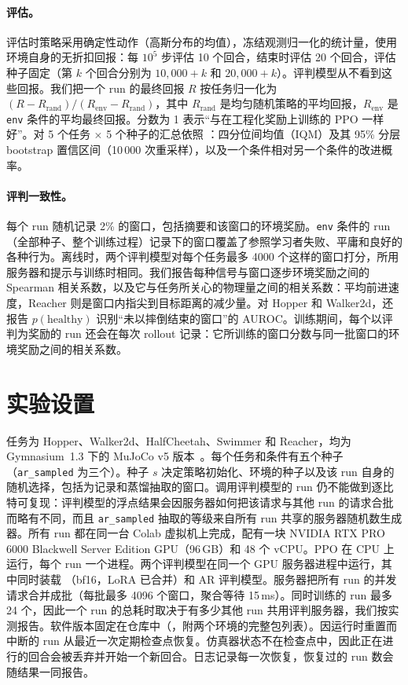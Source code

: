 \paragraph{评估。} 评估时策略采用确定性动作（高斯分布的均值），冻结观测归一化的统计量，使用环境自身的无折扣回报：每 $10^5$ 步评估 10 个回合，结束时评估 20 个回合，评估种子固定（第 $k$ 个回合分别为 $10,000+k$ 和 $20,000+k$）。评判模型从不看到这些回报。我们把一个 run 的最终回报 $R$ 按任务归一化为 $(R-R_{\text{rand}})/(R_{\text{env}}-R_{\text{rand}})$，其中 $R_{\text{rand}}$ 是均匀随机策略的平均回报，$R_{\text{env}}$ 是 \texttt{env} 条件的平均最终回报。分数为 1 表示“与在工程化奖励上训练的 PPO 一样好”。对 5 个任务 $\times$ 5 个种子的汇总依照 \citet{agarwal2021deep}：四分位间均值（IQM）及其 95\% 分层 bootstrap 置信区间（10\,000 次重采样），以及一个条件相对另一个条件的改进概率。

\paragraph{评判一致性。} 每个 run 随机记录 2\% 的窗口，包括摘要和该窗口的环境奖励。\texttt{env} 条件的 run（全部种子、整个训练过程）记录下的窗口覆盖了参照学习者失败、平庸和良好的各种行为。离线时，两个评判模型对每个任务最多 4000 个这样的窗口打分，所用服务器和提示与训练时相同。我们报告每种信号与窗口逐步环境奖励之间的 Spearman 相关系数，以及它与任务所关心的物理量之间的相关系数：平均前进速度，Reacher 则是窗口内指尖到目标距离的减少量。对 Hopper 和 Walker2d，还报告 $p(\text{healthy})$ 识别“未以摔倒结束的窗口”的 AUROC。训练期间，每个以评判为奖励的 run 还会在每次 rollout 记录：它所训练的窗口分数与同一批窗口的环境奖励之间的相关系数。

\section{实验设置}\label{sec:setup}

任务为 Hopper、Walker2d、HalfCheetah、Swimmer 和 Reacher，均为 Gymnasium~1.3 下的 MuJoCo v5 版本~\cite{todorov2012mujoco,towers2024gymnasium}。每个任务和条件有五个种子（\texttt{ar\_sampled} 为三个）。种子 $s$ 决定策略初始化、环境的种子以及该 run 自身的随机选择，包括为记录和蒸馏抽取的窗口。调用评判模型的 run 仍不能做到逐比特可复现：评判模型的浮点结果会因服务器如何把该请求与其他 run 的请求合批而略有不同，而且 \texttt{ar\_sampled} 抽取的等级来自所有 run 共享的服务器随机数生成器。所有 run 都在同一台 Colab 虚拟机上完成，配有一块 NVIDIA RTX PRO 6000 Blackwell Server Edition GPU（96\,GB）和 48 个 vCPU。PPO 在 CPU 上运行，每个 run 一个进程。两个评判模型在同一个 GPU 服务器进程中运行，其中同时装载 \kev{}（bf16，LoRA 已合并）和 AR 评判模型。服务器把所有 run 的并发请求合并成批（每批最多 4096 个窗口，聚合等待 15\,ms）。同时训练的 run 最多 24 个，因此一个 run 的总耗时取决于有多少其他 run 共用评判服务器，我们按实测报告。软件版本固定在仓库中（，附两个环境的完整包列表）。因运行时重置而中断的 run 从最近一次定期检查点恢复。仿真器状态不在检查点中，因此正在进行的回合会被丢弃并开始一个新回合。日志记录每一次恢复，恢复过的 run 数会随结果一同报告。
